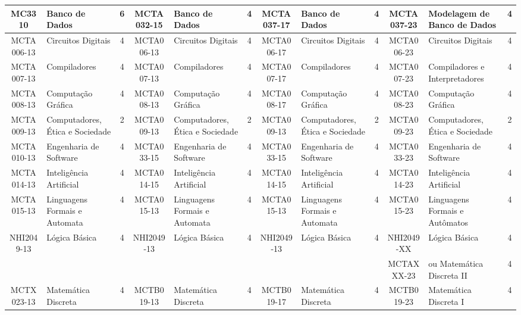 \documentclass[a4paper]{article}
\begin{document}
\begin{landscape}
{\begin{longtable}{|c|p{.2\textheight}|c||c|p{.2\textheight}|c||c|p{.2\textheight}|c||c|p{.2\textheight}|c|}
    MC3310 & Banco de Dados & 6 &
    MCTA032-15 & Banco de Dados & 4 &
    MCTA037-17 & Banco de Dados & 4 &
    MCTA037-23 & Modelagem de Banco de Dados & 4 \\ \hline

    MCTA006-13 & Circuitos Digitais & 4 &
    MCTA006-13 & Circuitos Digitais & 4 &
    MCTA006-17 & Circuitos Digitais & 4 &
    MCTA006-23 & Circuitos Digitais & 4 \\ \hline

    MCTA007-13 & Compiladores & 4 &
    MCTA007-13 & Compiladores & 4 &
    MCTA007-17 & Compiladores & 4 & 
    MCTA007-23 & Compiladores e Interpretadores & 4 \\ \hline

    MCTA008-13 & Computação Gráfica & 4 &
    MCTA008-13 & Computação Gráfica & 4 &
    MCTA008-17 & Computação Gráfica & 4 &
    MCTA008-23 & Computação Gráfica & 4 \\ \hline

    MCTA009-13 & Computadores, Ética e Sociedade & 2 &
    MCTA009-13 & Computadores, Ética e Sociedade & 2 &
    MCTA009-13 & Computadores, Ética e Sociedade & 2 &
    MCTA009-23 & Computadores, Ética e Sociedade & 2 \\ \hline

    MCTA010-13 & Engenharia de Software & 4 &
    MCTA033-15 & Engenharia de Software & 4 & 
    MCTA033-15 & Engenharia de Software & 4 & 
    MCTA033-23 & Engenharia de Software & 4 \\ \hline

    MCTA014-13 & Inteligência Artificial & 4 &
    MCTA014-15 & Inteligência Artificial & 4 & 
    MCTA014-15 & Inteligência Artificial & 4 &
    MCTA014-23 & Inteligência Artificial & 4 \\ \hline

    MCTA015-13 & Linguagens Formais e Automata & 4 &
    MCTA015-13 & Linguagens Formais e Automata & 4 &
    MCTA015-13 & Linguagens Formais e Automata & 4 & 
    MCTA015-23 & Linguagens Formais e Autômatos & 4 \\ \hline

    NHI2049-13 & Lógica Básica & 4 &
    NHI2049-13 & Lógica Básica & 4 &
    NHI2049-13 & Lógica Básica & 4 &
    NHI2049-XX & Lógica Básica & 4 \\

    & & &
    & & &
    & & &
    MCTAXXX-23 & ou Matemática Discreta II & 4 \\ \hline

    MCTX023-13 & Matemática Discreta & 4 & 
    MCTB019-13 & Matemática Discreta & 4 &
    MCTB019-17 & Matemática Discreta & 4 &
    MCTB019-23 & Matemática Discreta I & 4 \\ \hline


\end{longtable}}
\end{landscape}
\end{document}
